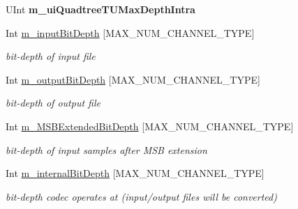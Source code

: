 \begin{DoxyCompactItemize}
\item 
\mbox{\label{class_t_app_enc_cfg_a66cc29dc73c7c7458ee44b021369b995}} 
U\+Int {\bfseries m\+\_\+ui\+Quadtree\+T\+U\+Max\+Depth\+Intra}
\item 
\mbox{\label{class_t_app_enc_cfg_aa333ce7223805d71023d0f08d9d01027}} 
Int \hyperlink{class_t_app_enc_cfg_aa333ce7223805d71023d0f08d9d01027}{m\+\_\+input\+Bit\+Depth} \mbox{[}M\+A\+X\+\_\+\+N\+U\+M\+\_\+\+C\+H\+A\+N\+N\+E\+L\+\_\+\+T\+Y\+PE\mbox{]}
\begin{DoxyCompactList}\small\item\em bit-\/depth of input file \end{DoxyCompactList}\item 
\mbox{\label{class_t_app_enc_cfg_a196a88a2e316b193628273a0f702f9fc}} 
Int \hyperlink{class_t_app_enc_cfg_a196a88a2e316b193628273a0f702f9fc}{m\+\_\+output\+Bit\+Depth} \mbox{[}M\+A\+X\+\_\+\+N\+U\+M\+\_\+\+C\+H\+A\+N\+N\+E\+L\+\_\+\+T\+Y\+PE\mbox{]}
\begin{DoxyCompactList}\small\item\em bit-\/depth of output file \end{DoxyCompactList}\item 
\mbox{\label{class_t_app_enc_cfg_ac96d3054421f88cdb60f59148e35d82d}} 
Int \hyperlink{class_t_app_enc_cfg_ac96d3054421f88cdb60f59148e35d82d}{m\+\_\+\+M\+S\+B\+Extended\+Bit\+Depth} \mbox{[}M\+A\+X\+\_\+\+N\+U\+M\+\_\+\+C\+H\+A\+N\+N\+E\+L\+\_\+\+T\+Y\+PE\mbox{]}
\begin{DoxyCompactList}\small\item\em bit-\/depth of input samples after M\+SB extension \end{DoxyCompactList}\item 
\mbox{\label{class_t_app_enc_cfg_a7a2fd61f72432ca3c14dffe14f8d3c11}} 
Int \hyperlink{class_t_app_enc_cfg_a7a2fd61f72432ca3c14dffe14f8d3c11}{m\+\_\+internal\+Bit\+Depth} \mbox{[}M\+A\+X\+\_\+\+N\+U\+M\+\_\+\+C\+H\+A\+N\+N\+E\+L\+\_\+\+T\+Y\+PE\mbox{]}
\begin{DoxyCompactList}\small\item\em bit-\/depth codec operates at (input/output files will be converted) \end{DoxyCompactList}\item 

\end{DoxyCompactItemize}
